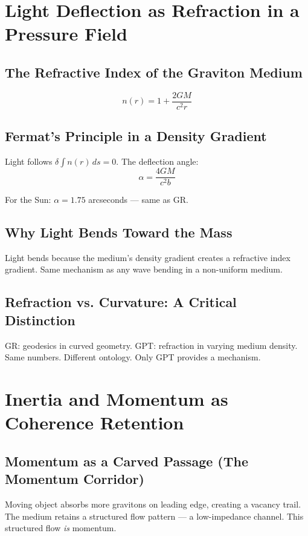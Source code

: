 \documentclass[12pt, a4paper]{article}
\begin{document}
\section{Light Deflection as Refraction in a Pressure Field}

\subsection{The Refractive Index of the Graviton Medium}
\[
n(r) = 1 + \frac{2GM}{c^2 r}
\]

\subsection{Fermat's Principle in a Density Gradient}

Light follows \( \delta \int n(r) \, ds = 0 \). The deflection angle:
\[
\alpha = \frac{4GM}{c^2 b}
\]

For the Sun: \( \alpha = 1.75 \) arcseconds — same as GR.

\subsection{Why Light Bends Toward the Mass}

Light bends because the medium's density gradient creates a refractive index gradient. Same mechanism as any wave bending in a non-uniform medium.

\subsection{Refraction vs. Curvature: A Critical Distinction}

GR: geodesics in curved geometry. GPT: refraction in varying medium density. Same numbers. Different ontology. Only GPT provides a mechanism.

\section{Inertia and Momentum as Coherence Retention}

\subsection{Momentum as a Carved Passage (The Momentum Corridor)}

Moving object absorbs more gravitons on leading edge, creating a vacancy trail. The medium retains a structured flow pattern — a low-impedance channel. This structured flow \textit{is} momentum.
\end{document}
